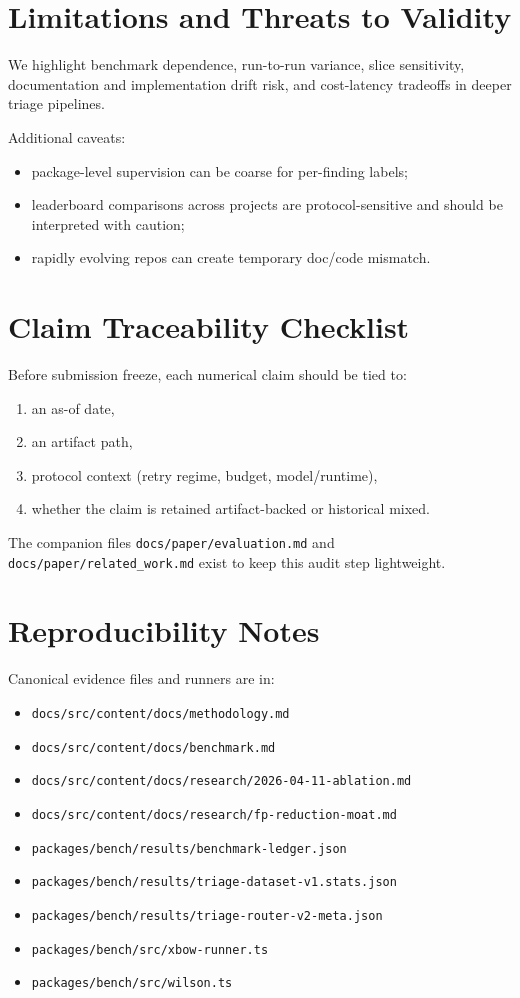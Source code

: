 \documentclass[11pt]{article}
\begin{document}
\section{Limitations and Threats to Validity}

We highlight benchmark dependence, run-to-run variance, slice sensitivity,
documentation and implementation drift risk, and cost-latency tradeoffs in deeper
triage pipelines.

Additional caveats:
\begin{itemize}
  \item package-level supervision can be coarse for per-finding labels;
  \item leaderboard comparisons across projects are protocol-sensitive and
  should be interpreted with caution;
  \item rapidly evolving repos can create temporary doc/code mismatch.
\end{itemize}

\section{Claim Traceability Checklist}

Before submission freeze, each numerical claim should be tied to:

\begin{enumerate}[leftmargin=*]
  \item an as-of date,
  \item an artifact path,
  \item protocol context (retry regime, budget, model/runtime),
  \item whether the claim is retained artifact-backed or historical mixed.
\end{enumerate}

The companion files \texttt{docs/paper/evaluation.md} and
\texttt{docs/paper/related\_work.md} exist to keep this audit step lightweight.

\section{Reproducibility Notes}

Canonical evidence files and runners are in:
\begin{itemize}
  \item \texttt{docs/src/content/docs/methodology.md}
  \item \texttt{docs/src/content/docs/benchmark.md}
  \item \texttt{docs/src/content/docs/research/2026-04-11-ablation.md}
  \item \texttt{docs/src/content/docs/research/fp-reduction-moat.md}
  \item \texttt{packages/bench/results/benchmark-ledger.json}
  \item \texttt{packages/bench/results/triage-dataset-v1.stats.json}
  \item \texttt{packages/bench/results/triage-router-v2-meta.json}
  \item \texttt{packages/bench/src/xbow-runner.ts}
  \item \texttt{packages/bench/src/wilson.ts}
\end{itemize}
\end{document}

